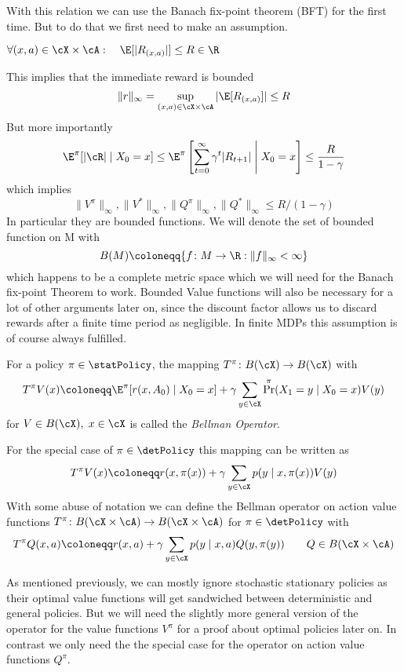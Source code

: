 With this relation we can use the Banach fix-point theorem (BFT) for the first time. But to do that we first need to make an assumption.
\begin{assumption} \label{assumption boundedness}
	\(\forall (x,a)\in\cX\times\cA:\quad\E[|R_{(x,a)}|]\le R\in\R\)
\end{assumption}
This implies that the immediate reward is bounded
\[
	\|r\|_{\infty}=\sup_{(x,a)\in\cX\times\cA}|\E[R_{(x,a)}]|\le R
\]
But more importantly
\[
	\E^\pi[|\cR| \mid X_0 = x]\le\E^\pi\left[\sum_{t=0}^\infty \gamma^t |R_{t+1}| \;\middle|\; X_0=x \right]
	\le \frac{R}{1-\gamma} 
\]
which implies 
\[
	\|V^\pi\|_\infty,\|V^*\|_\infty, \|Q^\pi\|_\infty,\|Q^*\|_\infty \le R/(1-\gamma)
\]
In particular they are bounded functions. We will denote the set of bounded function on M with 
\[
	B(M)\coloneqq \{f\colon M\to\R : \|f\|_\infty <\infty \} 
\]
which happens to be a complete metric space which we will need for the Banach fix-point Theorem to work. Bounded Value functions will also be necessary for a lot of other arguments later on, since the discount factor allows us to discard rewards after a finite time period as negligible.  In finite MDPs this assumption is of course always fulfilled. 


\begin{definition}
	For a policy \(\pi\in\statPolicy\), the mapping \(T^\pi\colon B(\cX)\to B(\cX)\) with
	\[
		T^\pi V(x)\coloneqq \E^\pi[r(x,A_0)\mid X_0=x] 
		+ \gamma \sum_{y\in\cX} \Pr^\pi(X_1=y\mid X_0=x) V(y)
	\]
	for \(V\in B(\cX),\; x\in\cX\) is called the \emph{Bellman Operator}.

	For the special case of \(\pi\in\detPolicy\) this mapping can be written as
	\[
		T^\pi V(x)\coloneqq r(x,\pi(x))+\gamma\sum_{y\in\cX}p(y\mid x,\pi(x)) V(y)
	\]
	With some abuse of notation we can define the Bellman operator on action value functions \(T^\pi\colon B(\cX\times\cA)\to B(\cX\times\cA)\) for \(\pi\in\detPolicy\) with
	\[
		T^\pi Q(x,a)\coloneqq r(x,a)
		+\gamma\sum_{y\in\cX}p(y\mid x,a) Q(y,\pi(y)) 
		\qquad Q\in B(\cX\times\cA)
	\]	
\end{definition}
As mentioned previously, we can mostly ignore stochastic stationary policies as their optimal value functions will get sandwiched between deterministic and general policies. But we will need the slightly more general version of the operator for the value functions \(V^\pi\) for a proof about optimal policies later on. In contrast we only need the the special case for the operator on action value functions \(Q^\pi\).

